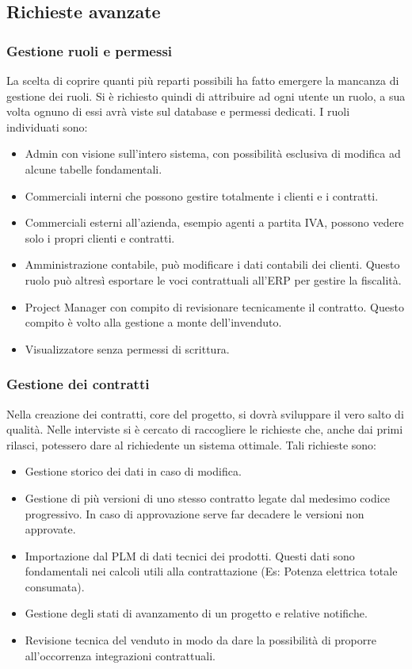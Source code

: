 \subsection{Richieste avanzate}
\subsubsection{Gestione ruoli e permessi}
La scelta di coprire quanti più reparti possibili ha fatto emergere la mancanza di gestione dei ruoli.
Si è richiesto quindi di attribuire ad ogni utente un ruolo,
a sua volta ognuno di essi avrà viste sul database e permessi dedicati.
I ruoli individuati sono:
\begin{itemize}
    \item Admin con visione sull'intero sistema, con possibilità esclusiva di modifica ad alcune tabelle fondamentali.
    \item Commerciali interni che possono gestire totalmente i clienti e i contratti.
    \item Commerciali esterni all'azienda, esempio agenti a partita IVA, possono vedere solo i propri clienti e contratti.
    \item Amministrazione contabile, può modificare i dati contabili dei clienti.
          Questo ruolo può altresì esportare le voci contrattuali all'\ac{ERP} per gestire la fiscalità.
    \item Project Manager con compito di revisionare tecnicamente il contratto.
          Questo compito è volto alla gestione a monte dell'invenduto.
    \item Visualizzatore senza permessi di scrittura.
\end{itemize}
\subsubsection{Gestione dei contratti}
Nella creazione dei contratti, core del progetto, si dovrà sviluppare il vero salto di qualità.
Nelle interviste si è cercato di raccogliere le richieste che, anche dai primi rilasci,
potessero dare al richiedente un sistema ottimale.
Tali richieste sono:
\begin{itemize}
    \item Gestione storico dei dati in caso di modifica.
    \item Gestione di più versioni di uno stesso contratto legate dal medesimo codice progressivo.
          In caso di approvazione serve far decadere le versioni non approvate.
    \item Importazione dal \ac{PLM} di dati tecnici dei prodotti. Questi dati sono fondamentali nei
          calcoli utili alla contrattazione (Es: Potenza elettrica totale consumata).
    \item Gestione degli stati di avanzamento di un progetto e relative notifiche.
    \item Revisione tecnica del venduto in modo da dare la possibilità di proporre
          all'occorrenza integrazioni contrattuali.
\end{itemize}
